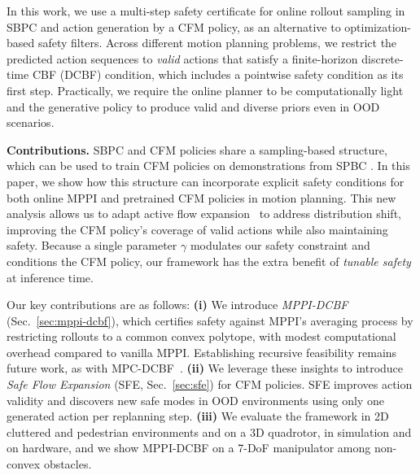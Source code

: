 \documentclass[letterpaper, 10 pt, conference]{ieeeconf}
\begin{document}
In this work, we use a multi-step safety certificate for  online rollout sampling in SBPC and action generation by a CFM policy,
as an alternative to optimization-based safety filters. Across different motion planning problems, we restrict the predicted action sequences to \emph{valid} actions that satisfy a finite-horizon discrete-time CBF (DCBF) condition, which includes a pointwise safety condition as its first step. Practically, we require the online planner to be computationally light and the generative policy to produce valid and diverse priors even in OOD scenarios. 

\textbf{Contributions.} SBPC and CFM policies share a sampling-based structure, which can be used to train CFM policies on demonstrations from SPBC \cite{Kurtz_GPC}. In this paper, we show how this structure can incorporate explicit safety conditions for both online MPPI and pretrained CFM policies in motion planning. This new analysis allows us to adapt active flow expansion~\cite{de2026active} to address distribution shift, improving the CFM policy's coverage of valid actions while also maintaining safety. Because a single parameter $\gamma$ modulates our safety constraint and conditions the CFM policy, our framework has the extra benefit of \textit{tunable safety} at inference time.

Our key contributions are as follows: \textbf{(i)} 
We introduce \emph{MPPI-DCBF} (Sec.~\ref{sec:mppi-dcbf}), which certifies safety against MPPI's averaging process by restricting rollouts to a common convex polytope, with modest computational overhead compared to vanilla MPPI.
Establishing recursive feasibility remains future work, as with MPC-DCBF~\cite{zeng2021enhancing}.
\textbf{(ii)}  
We leverage these insights to introduce {\em Safe Flow Expansion} (SFE, Sec.~\ref{sec:sfe}) for CFM policies.
SFE improves action validity and discovers new safe modes in OOD environments using only one generated action per replanning step.
\textbf{(iii)} 
We evaluate the framework in 2D cluttered and pedestrian environments and on a 3D quadrotor, in simulation and on hardware, and we show MPPI-DCBF on a 7-DoF manipulator among non-convex obstacles.
\end{document}
